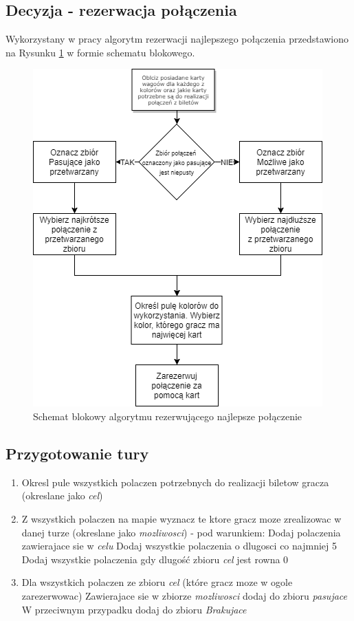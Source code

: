 \documentclass[12pt, oneside]{report}
\begin{document}
\subsection{Decyzja - rezerwacja połączenia}
Wykorzystany w pracy algorytm rezerwacji najlepszego połączenia przedstawiono na Rysunku \ref{figure:connection_diagram} w formie schematu blokowego.
\begin{figure}[h]
	\centering
	\includegraphics[height=0.6\textheight]{ConnectionClaim.png}
	\caption{Schemat blokowy algorytmu rezerwującego najlepsze połączenie}
	\label{figure:connection_diagram}
\end{figure}

\subsection{Przygotowanie tury}
\begin{enumerate}
	\item Okresl pule wszystkich polaczen potrzebnych do realizacji biletow gracza (okreslane jako \textit{cel})
	\item Z wszystkich polaczen na mapie wyznacz te ktore gracz moze zrealizowac w danej turze (okreslane jako \textit{mozliwosci}) - pod warunkiem:
	\subitem Dodaj polaczenia zawierajace sie w \textit{celu}
	\subitem Dodaj wszystkie polaczenia o dlugosci co najmniej 5
	\subitem Dodaj wszystkie polaczenia gdy dlugość zbioru \textit{cel} jest rowna 0
	\item Dla wszystkich polaczen ze zbioru \textit{cel} (które gracz moze w ogole zarezerwowac)
	\subitem Zawierajace sie w zbiorze \textit{mozliwosci} dodaj do zbioru \textit{pasujace}
	\subitem W przeciwnym przypadku dodaj do zbioru \textit{Brakujace}
	
\end{enumerate}
\end{document}

